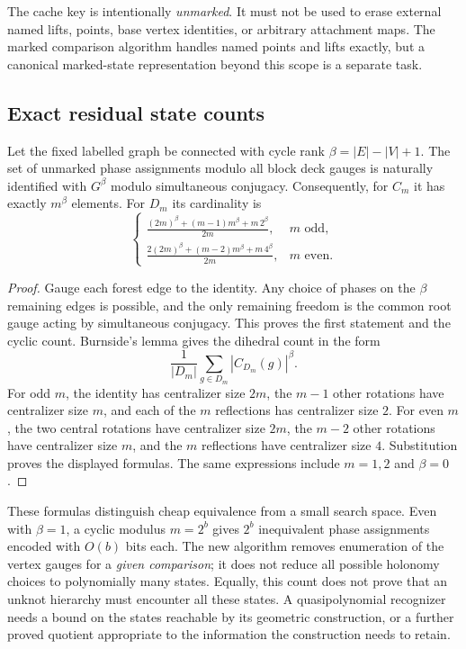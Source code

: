 The cache key is intentionally \emph{unmarked}.  It must not be used to
erase external named lifts, points, base vertex identities, or arbitrary
attachment maps.  The marked comparison algorithm handles named points
and lifts exactly, but a canonical marked-state representation beyond
this scope is a separate task.

\subsection{Exact residual state counts}

\begin{theorem}
Let the fixed labelled graph be connected with cycle rank
$\beta=|E|-|V|+1$.  The set of unmarked phase assignments modulo all block
deck gauges is naturally identified with $G^\beta$ modulo simultaneous
conjugacy.  Consequently, for $C_m$ it has exactly $m^\beta$ elements.
For $D_m$ its cardinality is
\[
 \begin{cases}
 \displaystyle
 \frac{(2m)^\beta+(m-1)m^\beta+m\,2^\beta}{2m},
 &m\text{ odd},\\[2ex]
 \displaystyle
 \frac{2(2m)^\beta+(m-2)m^\beta+m\,4^\beta}{2m},
 &m\text{ even}.
 \end{cases}
\]
\end{theorem}
\begin{proof}
Gauge each forest edge to the identity.  Any choice of phases on the
$\beta$ remaining edges is possible, and the only remaining freedom is
the common root gauge acting by simultaneous conjugacy.  This proves the
first statement and the cyclic count.
Burnside's lemma gives the dihedral count in the form
\[
 \frac1{|D_m|}\sum_{g\in D_m}|C_{D_m}(g)|^\beta.
\]
For odd $m$, the identity has centralizer size $2m$, the $m-1$ other
rotations have centralizer size $m$, and each of the $m$ reflections has
centralizer size $2$.  For even $m$, the two central rotations have
centralizer size $2m$, the $m-2$ other rotations have centralizer size $m$,
and the $m$ reflections have centralizer size $4$.  Substitution proves
the displayed formulas.  The same expressions include $m=1,2$ and
$\beta=0$.
\end{proof}

These formulas distinguish cheap equivalence from a small search space.
Even with $\beta=1$, a cyclic modulus $m=2^b$ gives $2^b$ inequivalent
phase assignments encoded with $O(b)$ bits each.  The new algorithm
removes enumeration of the vertex gauges for a \emph{given comparison};
it does not reduce all possible holonomy choices to polynomially many
states.  Equally, this count does not prove that an unknot hierarchy
must encounter all these states.  A quasipolynomial recognizer needs a
bound on the states reachable by its geometric construction, or a
further proved quotient appropriate to the information the construction
needs to retain.

